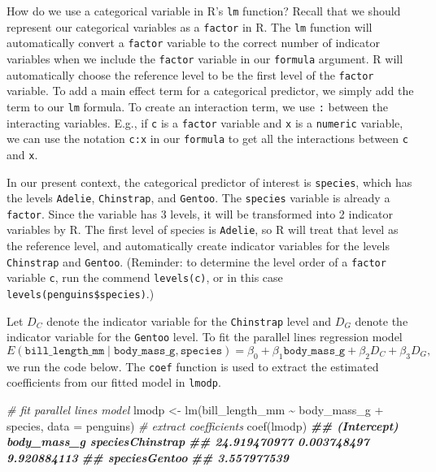 \documentclass[
]{book}
\newenvironment{Shaded}{\begin{snugshade}}{\end{snugshade}}
\newcommand{\AttributeTok}[1]{\textcolor[rgb]{0.77,0.63,0.00}{#1}}
\newcommand{\CommentTok}[1]{\textcolor[rgb]{0.56,0.35,0.01}{\textit{#1}}}
\newcommand{\DocumentationTok}[1]{\textcolor[rgb]{0.56,0.35,0.01}{\textbf{\textit{#1}}}}
\newcommand{\FunctionTok}[1]{\textcolor[rgb]{0.00,0.00,0.00}{#1}}
\newcommand{\NormalTok}[1]{#1}
\newcommand{\OtherTok}[1]{\textcolor[rgb]{0.56,0.35,0.01}{#1}}
\newcommand{\SpecialCharTok}[1]{\textcolor[rgb]{0.00,0.00,0.00}{#1}}
\theoremstyle{definition}
\theoremstyle{definition}
\theoremstyle{definition}
\theoremstyle{definition}
\theoremstyle{remark}
\begin{document}
How do we use a categorical variable in R's \texttt{lm} function? Recall that we should represent our categorical variables as a \texttt{factor} in R. The \texttt{lm} function will automatically convert a \texttt{factor} variable to the correct number of indicator variables when we include the \texttt{factor} variable in our \texttt{formula} argument. R will automatically choose the reference level to be the first level of the \texttt{factor} variable. To add a main effect term for a categorical predictor, we simply add the term to our \texttt{lm} formula. To create an interaction term, we use \texttt{:} between the interacting variables. E.g., if \texttt{c} is a \texttt{factor} variable and \texttt{x} is a \texttt{numeric} variable, we can use the notation \texttt{c:x} in our \texttt{formula} to get all the interactions between \texttt{c} and \texttt{x}.

In our present context, the categorical predictor of interest is \texttt{species}, which has the levels \texttt{Adelie}, \texttt{Chinstrap}, and \texttt{Gentoo}. The \texttt{species} variable is already a \texttt{factor}. Since the variable has 3 levels, it will be transformed into 2 indicator variables by R. The first level of species is \texttt{Adelie}, so R will treat that level as the reference level, and automatically create indicator variables for the levels \texttt{Chinstrap} and \texttt{Gentoo}. (Reminder: to determine the level order of a \texttt{factor} variable \texttt{c}, run the commend \texttt{levels(c)}, or in this case \texttt{levels(penguins\$species)}.)

Let \(D_C\) denote the indicator variable for the \texttt{Chinstrap} level and \(D_G\) denote the indicator variable for the \texttt{Gentoo} level. To fit the parallel lines regression model
\[E(\mathtt{bill\_length\_mm} \mid \mathtt{body\_mass\_g}, \mathtt{species}) = \beta_{0} + \beta_1 \mathtt{body\_mass\_g} + \beta_2 D_C + \beta_3 D_G,\]
we run the code below. The \texttt{coef} function is used to extract the estimated coefficients from our fitted model in \texttt{lmodp}.

\begin{Shaded}
\begin{Highlighting}[]
\CommentTok{\# fit parallel lines model}
\NormalTok{lmodp }\OtherTok{\textless{}{-}} \FunctionTok{lm}\NormalTok{(bill\_length\_mm }\SpecialCharTok{\textasciitilde{}}\NormalTok{ body\_mass\_g }\SpecialCharTok{+}\NormalTok{ species, }\AttributeTok{data =}\NormalTok{ penguins)}
\CommentTok{\# extract coefficients}
\FunctionTok{coef}\NormalTok{(lmodp)}
\DocumentationTok{\#\#      (Intercept)      body\_mass\_g speciesChinstrap }
\DocumentationTok{\#\#     24.919470977      0.003748497      9.920884113 }
\DocumentationTok{\#\#    speciesGentoo }
\DocumentationTok{\#\#      3.557977539}
\end{Highlighting}
\end{Shaded}
\end{document}

